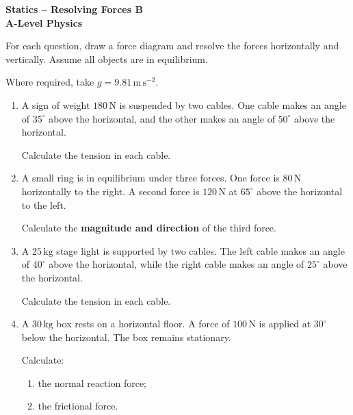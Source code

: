 \documentclass[12pt,a4paper]{article}
\begin{document}
\begin{center}
    {\Large\textbf{Statics -- Resolving Forces B}}\\[4pt]
    \textbf{A-Level Physics}
\end{center}

For each question, draw a force diagram and resolve the forces
horizontally and vertically. Assume all objects are in equilibrium.

Where required, take \(g = 9.81\,\mathrm{m\,s^{-2}}\).

\vspace{0.5cm}

\begin{enumerate}[leftmargin=*, itemsep=1em]

\item
A sign of weight \(180\,\mathrm{N}\) is suspended by two cables.
One cable makes an angle of \(35^\circ\) above the horizontal,
and the other makes an angle of \(50^\circ\) above the horizontal.

Calculate the tension in each cable.

\vspace{1.2cm}

\item
A small ring is in equilibrium under three forces.
One force is \(80\,\mathrm{N}\) horizontally to the right.
A second force is \(120\,\mathrm{N}\) at \(65^\circ\) above
the horizontal to the left.

Calculate the \textbf{magnitude and direction} of the third force.

\vspace{1.2cm}

\item
A \(25\,\mathrm{kg}\) stage light is supported by two cables.
The left cable makes an angle of \(40^\circ\) above the horizontal,
while the right cable makes an angle of \(25^\circ\) above the horizontal.

Calculate the tension in each cable.

\vspace{1.2cm}

\item
A \(30\,\mathrm{kg}\) box rests on a horizontal floor.
A force of \(100\,\mathrm{N}\) is applied at \(30^\circ\)
below the horizontal. The box remains stationary.

Calculate:

\begin{enumerate}[label=(\alph*)]
    \item the normal reaction force;
    \item the frictional force.
\end{enumerate}


\end{enumerate}
\end{document}
